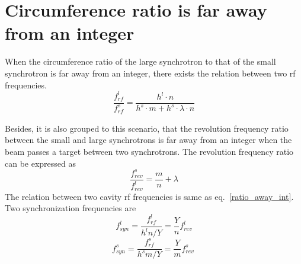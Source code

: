 \section{Circumference ratio is far away from an integer} 
When the circumference ratio of the large synchrotron to that of the small synchrotron is far away from an integer, there exists the relation between two rf frequencies. 
\begin{equation}
\label{ratio_away_int}
\frac{f_{\mathit{rf}}^{l}}{f_{\mathit{rf}}^{s}}=\frac{h^l\cdot n}{h^s \cdot m+ h^s \cdot\lambda\cdot n}
\end{equation}

%
%




Besides, it is also grouped to this scenario, that the revolution frequency ratio between the small and large synchrotrons is far away from an integer when the beam passes a target between two synchrotrons. The revolution frequency ratio can be expressed as
\begin{equation} 
\frac{f_{\mathit{rev}}^{s}}{f_{\mathit{rev}}^{l}}=\frac{m}{n}+ \lambda\label{close_to_interger2}
\end{equation}
The relation between two cavity rf frequencies is same as eq.~\ref{ratio_away_int}. Two synchronization frequencies are
\begin{equation}
f_{\mathit{syn}}^{l}=\frac{f_{\mathit{rf}}^{l}}{h^{l}n/Y}=\frac{Y}{n}f_{\mathit{rev}}^{l} \label{synch_freq111_r}
\end{equation}
\begin{equation}
f_{\mathit{syn}}^{s}=\frac{f_{\mathit{rf}}^{s}}{h^{s}m/Y}=\frac{Y}{m}f_{\mathit{rev}}^{s} \ \label{synch_freq222_r}
\end{equation}


